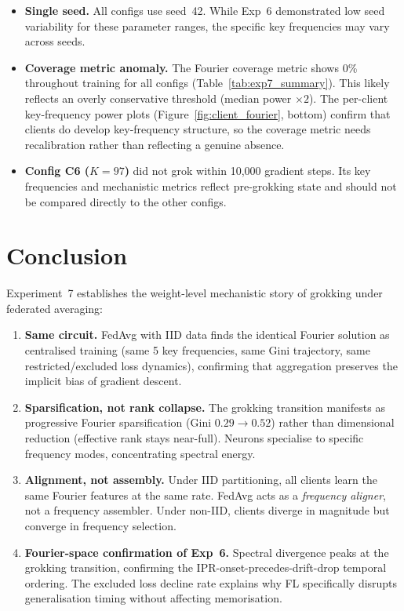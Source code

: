 \documentclass{article}
\begin{document}
\begin{itemize}[nosep]
\item \textbf{Single seed.}  All configs use seed~42.  While Exp~6
demonstrated low seed variability for these parameter ranges, the specific
key frequencies may vary across seeds.
\item \textbf{Coverage metric anomaly.}  The Fourier coverage metric shows
0\% throughout training for all configs (Table~\ref{tab:exp7_summary}).
This likely reflects an overly conservative threshold (median power
$\times 2$).  The per-client key-frequency power plots
(Figure~\ref{fig:client_fourier}, bottom) confirm that clients do develop
key-frequency structure, so the coverage metric needs recalibration rather
than reflecting a genuine absence.
\item \textbf{Config C6 ($K{=}97$)} did not grok within 10{,}000 gradient
steps.  Its key frequencies and mechanistic metrics reflect pre-grokking
state and should not be compared directly to the other configs.
\end{itemize}

\section{Conclusion}

Experiment~7 establishes the weight-level mechanistic story of grokking
under federated averaging:

\begin{enumerate}
\item \textbf{Same circuit.}  FedAvg with IID data finds the identical
Fourier solution as centralised training (same 5 key frequencies, same Gini
trajectory, same restricted/excluded loss dynamics), confirming that
aggregation preserves the implicit bias of gradient descent.

\item \textbf{Sparsification, not rank collapse.}  The grokking transition
manifests as progressive Fourier sparsification (Gini $0.29 \to 0.52$) rather
than dimensional reduction (effective rank stays near-full).  Neurons
specialise to specific frequency modes, concentrating spectral energy.

\item \textbf{Alignment, not assembly.}  Under IID partitioning, all clients
learn the same Fourier features at the same rate.  FedAvg acts as a
\emph{frequency aligner}, not a frequency assembler.  Under non-IID,
clients diverge in magnitude but converge in frequency selection.

\item \textbf{Fourier-space confirmation of Exp~6.}  Spectral divergence
peaks at the grokking transition, confirming the IPR-onset-precedes-drift-drop
temporal ordering.  The excluded loss decline rate explains why FL
specifically disrupts generalisation timing without affecting memorisation.
\end{enumerate}
\end{document}
